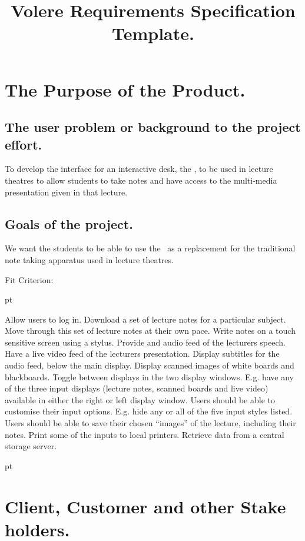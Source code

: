 \title{Volere Requirements Specification Template.}

\mainfont


\section{The Purpose of the Product.}

\subsection{The user problem or background to the project effort.}

To develop the interface for an interactive desk, the \iDesk, to be used in lecture theatres to allow students to take notes and have access to the multi-media presentation given in that lecture.

\subsection{Goals of the project.}

We want the students to be able to use the \iDesk\ as a replacement for the traditional note taking apparatus used in lecture theatres.

Fit Criterion:

 pt

\items Allow users to log in.
\items Download a set of lecture notes for a particular subject.
\items Move through this set of lecture notes at their own pace.
\items Write notes on a touch sensitive screen using a stylus.
\items Provide and audio feed of the lecturers speech.
\items Have a live video feed of the lecturers presentation.
\items Display subtitles for the audio feed, below the main display.
\items Display scanned images of white boards and blackboards.
\items Toggle between displays in the two display windows. E.g. have any of the three input displays (lecture notes, scanned boards and live video) available in either the right or left display window.
\items Users should be able to customise their input options. E.g. hide any or all of the five input styles listed.
\items Users should be able to save their chosen ``images'' of the lecture, including their notes.
\items Print some of the inputs to local printers.
\items Retrieve data from a central storage server.

 pt

\section{Client, Customer and other Stake holders.}

